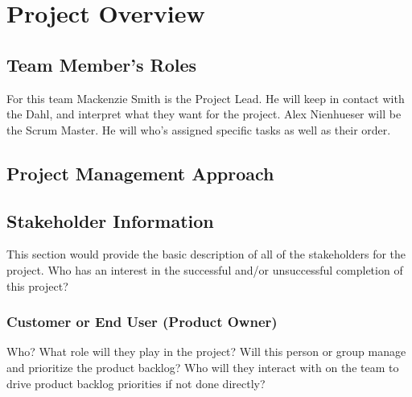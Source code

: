 

\chapter{Project Overview}



\section{Team Member's Roles}
For this team Mackenzie Smith is the Project Lead. He will keep in contact with the Dahl, and interpret what they want for the project. Alex Nienhueser will be the Scrum Master. He will who's assigned specific tasks as well as their order.

\section{Project  Management Approach}


\section{ Stakeholder Information}


This section would provide the basic description of all of the stakeholders for 
the project.  Who has an interest in the successful and/or unsuccessful completion 
of this project? 


\subsection{Customer or End User (Product Owner)}
Who?  What role will they play in the project?  Will this person or group manage 
and prioritize the product backlog?  Who will they interact with on the team to 
drive product backlog priorities if not done directly? 

